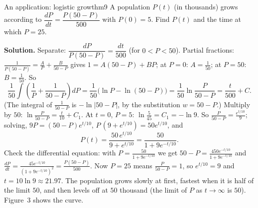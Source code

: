 \documentclass[11pt]{article}
\begin{document}
\begin{exmp}{An application: logistic growth}{m9}
A population $P(t)$ (in thousands) grows according to $\dfrac{dP}{dt}=\dfrac{P(50-P)}{500}$ with $P(0)=5$. Find $P(t)$ and the time at which $P=25$.

\textbf{Solution.} Separate: $\dfrac{dP}{P(50-P)}=\dfrac{dt}{500}$ (for $0<P<50$). Partial fractions: $\frac1{P(50-P)}=\frac AP+\frac B{50-P}$ gives $1=A(50-P)+BP$; at $P=0$: $A=\frac1{50}$; at $P=50$: $B=\frac1{50}$. So
\[\frac1{50}\int\left(\frac1P+\frac1{50-P}\right)dP=\frac1{50}\Big(\ln P-\ln(50-P)\Big)=\frac1{50}\ln\frac P{50-P}=\frac t{500}+C .\]
(The integral of $\frac1{50-P}$ is $-\ln\lvert50-P\rvert$, by the substitution $w=50-P$.) Multiply by $50$: $\ln\frac P{50-P}=\frac t{10}+C_1$. At $t=0$, $P=5$: $\ln\frac5{45}=C_1=-\ln9$. So $\frac P{50-P}=\frac{e^{t/10}}9$; solving, $9P=(50-P)e^{t/10}$, $P\,(9+e^{t/10})=50e^{t/10}$, and
\[P(t)=\frac{50\,e^{t/10}}{9+e^{t/10}}=\frac{50}{1+9e^{-t/10}} .\]
Check the differential equation: with $P=\frac{50}{1+9e^{-t/10}}$ we get $50-P=\frac{450e^{-t/10}}{1+9e^{-t/10}}$ and $\frac{dP}{dt}=\frac{45e^{-t/10}}{(1+9e^{-t/10})^2}=\frac{P(50-P)}{500}$. Now $P=25$ means $\frac P{50-P}=1$, so $e^{t/10}=9$ and $t=10\ln9\approx21.97$.
The population grows slowly at first, fastest when it is half of the limit $50$, and then levels off at $50$ thousand (the limit of $P$ as $t\to\infty$ is $50$). Figure~3 shows the curve.


\end{exmp}
\end{document}
